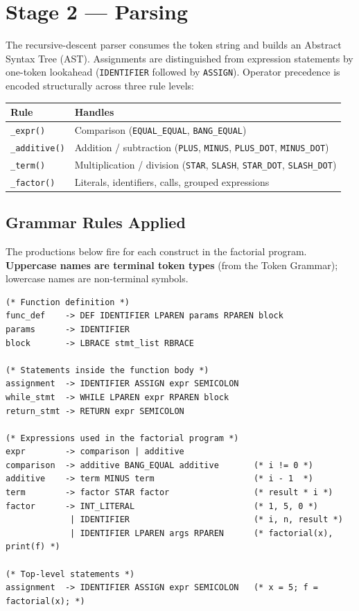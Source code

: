 \documentclass[11pt,a4paper]{article}
\begin{document}
\section{Stage 2 --- Parsing}

The recursive-descent parser consumes the token string and builds an
Abstract Syntax Tree (AST).  Assignments are distinguished from expression
statements by one-token lookahead (\texttt{IDENTIFIER} followed by
\texttt{ASSIGN}).  Operator precedence is encoded structurally across three
rule levels:

\begin{center}
\begin{tabular}{ll}
  \toprule
  \textbf{Rule} & \textbf{Handles} \\
  \midrule
  \texttt{\_expr()}     & Comparison (\texttt{EQUAL\_EQUAL}, \texttt{BANG\_EQUAL}) \\
  \texttt{\_additive()} & Addition / subtraction (\texttt{PLUS}, \texttt{MINUS}, \texttt{PLUS\_DOT}, \texttt{MINUS\_DOT}) \\
  \texttt{\_term()}     & Multiplication / division (\texttt{STAR}, \texttt{SLASH}, \texttt{STAR\_DOT}, \texttt{SLASH\_DOT}) \\
  \texttt{\_factor()}   & Literals, identifiers, calls, grouped expressions \\
  \bottomrule
\end{tabular}
\end{center}

\subsection*{Grammar Rules Applied}

The productions below fire for each construct in the factorial program.
\textbf{Uppercase names are terminal token types} (from the Token Grammar);
lowercase names are non-terminal symbols.

\begin{lstlisting}[language={},numbers=none,frame=none,backgroundcolor=\color{white}]
(* Function definition *)
func_def    -> DEF IDENTIFIER LPAREN params RPAREN block
params      -> IDENTIFIER
block       -> LBRACE stmt_list RBRACE

(* Statements inside the function body *)
assignment  -> IDENTIFIER ASSIGN expr SEMICOLON
while_stmt  -> WHILE LPAREN expr RPAREN block
return_stmt -> RETURN expr SEMICOLON

(* Expressions used in the factorial program *)
expr        -> comparison | additive
comparison  -> additive BANG_EQUAL additive       (* i != 0 *)
additive    -> term MINUS term                    (* i - 1  *)
term        -> factor STAR factor                 (* result * i *)
factor      -> INT_LITERAL                        (* 1, 5, 0 *)
             | IDENTIFIER                         (* i, n, result *)
             | IDENTIFIER LPAREN args RPAREN      (* factorial(x), print(f) *)

(* Top-level statements *)
assignment  -> IDENTIFIER ASSIGN expr SEMICOLON   (* x = 5; f = factorial(x); *)
\end{lstlisting}
\end{document}
